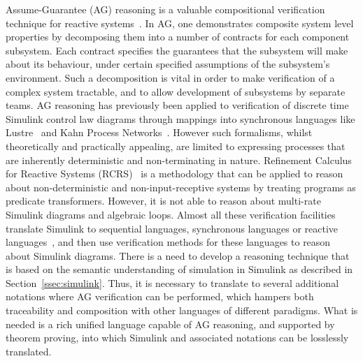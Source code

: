 Assume-Guarantee (AG) reasoning is a valuable compositional verification technique for reactive systems~\cite{Meyer1992, Jones2003, Bauer2012}. In AG, one demonstrates composite system level properties by decomposing them into a number of contracts for each component subsystem. Each contract specifies the guarantees that the subsystem will make about its behaviour, under certain specified assumptions of the subsystem's environment. Such a decomposition is vital in order to make verification of a complex system tractable, and to allow development of subsystems by separate teams. AG reasoning has previously been applied to verification of discrete time Simulink control law diagrams through mappings into synchronous languages like Lustre~\cite{Tripakis2005} and Kahn Process Networks~\cite{Bostroem2016}. However such formalisms, whilst theoretically and practically appealing, are limited to expressing processes that are inherently deterministic and non-terminating in nature. Refinement Calculus for Reactive Systems (RCRS)~\cite{Preoteasa2017} is a methodology that can be applied to reason about non-deterministic and non-input-receptive systems by treating programs as predicate transformers. However, it is not able to reason about multi-rate Simulink diagrams and algebraic loops. Almost all these verification facilities translate Simulink to sequential languages, synchronous languages or reactive languages~\cite{Cavalcanti2005a}, and then use verification methods for these languages to reason about Simulink diagrams. There is a need to develop a reasoning technique that is based on the semantic understanding of simulation in Simulink as described in Section~\ref{ssec:simulink}. Thus, it is necessary to translate to several additional notations where AG verification can be performed, which hampers both traceability and composition with other languages of different paradigms. What is needed is a rich unified language capable of AG reasoning, and supported by theorem proving, into which Simulink and associated notations can be losslessly translated.

